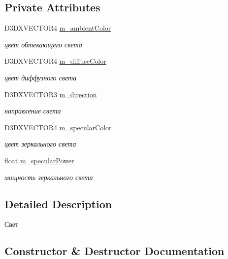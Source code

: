 \subsection*{Private Attributes}
\begin{DoxyCompactItemize}
\item 
D3\+D\+X\+V\+E\+C\+T\+O\+R4 \hyperlink{class_light_class_a75d64ffd0574b2a06c54f55ffff3746a}{m\+\_\+ambient\+Color}
\begin{DoxyCompactList}\small\item\em цвет обтекающего света \end{DoxyCompactList}\item 
D3\+D\+X\+V\+E\+C\+T\+O\+R4 \hyperlink{class_light_class_a3c04aa5b64e4cdb0f842cd0720ec957b}{m\+\_\+diffuse\+Color}
\begin{DoxyCompactList}\small\item\em цвет диффузного света \end{DoxyCompactList}\item 
D3\+D\+X\+V\+E\+C\+T\+O\+R3 \hyperlink{class_light_class_aaa2285076fbda3a3f131bd940b5c2219}{m\+\_\+direction}
\begin{DoxyCompactList}\small\item\em направление света \end{DoxyCompactList}\item 
D3\+D\+X\+V\+E\+C\+T\+O\+R4 \hyperlink{class_light_class_a8b7cf2373ae749c29f5c083d58cc245b}{m\+\_\+specular\+Color}
\begin{DoxyCompactList}\small\item\em цвет зеркального света \end{DoxyCompactList}\item 
float \hyperlink{class_light_class_aaced0580b7a432b1a501f2f1cc360c08}{m\+\_\+specular\+Power}
\begin{DoxyCompactList}\small\item\em мощность зеркального света \end{DoxyCompactList}\end{DoxyCompactItemize}


\subsection{Detailed Description}
Свет 

\subsection{Constructor \& Destructor Documentation}
\mbox{\label{class_light_class_a2a2026c39b7ad9acae4c8402a3d2b1db}} 
